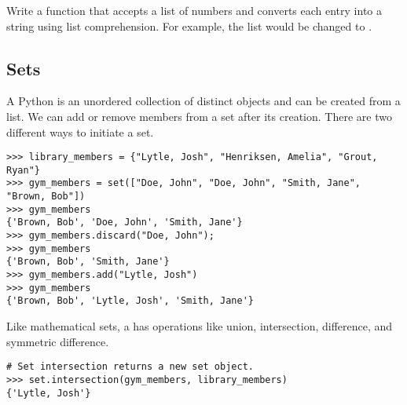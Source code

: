 \begin{problem}
Write a function that accepts a list of numbers and converts each entry into a string using list comprehension.  For example, the list \li{[1, 2, 3]} would be changed to \li{["1", "2", "3"]}.
\end{problem}



\subsection*{Sets}
A Python  is an unordered collection of distinct objects and can be created from a list. We can add or remove members from a set after its creation. There are two different ways to initiate a set.
\begin{lstlisting}
>>> library_members = {"Lytle, Josh", "Henriksen, Amelia", "Grout, Ryan"}
>>> gym_members = set(["Doe, John", "Doe, John", "Smith, Jane", "Brown, Bob"])
>>> gym_members
{'Brown, Bob', 'Doe, John', 'Smith, Jane'}
>>> gym_members.discard("Doe, John");
>>> gym_members
{'Brown, Bob', 'Smith, Jane'}
>>> gym_members.add("Lytle, Josh")
>>> gym_members
{'Brown, Bob', 'Lytle, Josh', 'Smith, Jane'}
\end{lstlisting}

Like mathematical sets, a  has operations like union, intersection, 
difference, and symmetric difference.
\begin{lstlisting}
# Set intersection returns a new set object.
>>> set.intersection(gym_members, library_members)
{'Lytle, Josh'}
\end{lstlisting}

%


